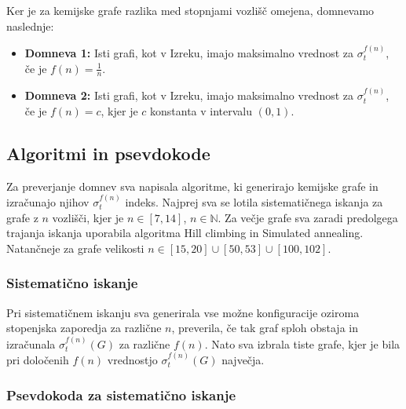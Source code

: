 \documentclass{article}
\begin{document}
Ker je za kemijske grafe razlika med stopnjami vozlišč omejena, domnevamo naslednje: 

\begin{itemize}
    \item \textbf{Domneva 1:} Isti grafi, kot v Izreku, imajo maksimalno vrednost za $\sigma_t^{f(n)}$, če je $f(n) = \frac{1}{n}$. 
    \item \textbf{Domneva 2:} Isti grafi, kot v Izreku, imajo maksimalno vrednost za $\sigma_t^{f(n)}$, če je $f(n) = c$, kjer je $c$ konstanta v intervalu $(0, 1)$. 

\end{itemize}

\subsection*{Algoritmi in psevdokode}
Za preverjanje domnev sva napisala algoritme, ki generirajo kemijske grafe in izračunajo njihov $\sigma_t^{f(n)}$ indeks.
Najprej sva se lotila sistematičnega iskanja za grafe z $n$ vozlišči, kjer je $n \in [7, 14]$, $n \in \mathbb{N}$.
Za večje grafe sva zaradi predolgega trajanja iskanja uporabila algoritma Hill climbing in Simulated annealing. Natančneje
za grafe velikosti $n \in [15, 20] \cup [50, 53] \cup [100, 102]$.

\subsubsection*{Sistematično iskanje}
Pri sistematičnem iskanju sva generirala vse možne konfiguracije oziroma
stopenjska zaporedja za različne $n$, preverila, če tak graf sploh obstaja
in izračunala $\sigma_t^{f(n)}(G)$ za različne $f(n)$. Nato sva
izbrala tiste grafe, kjer je bila pri določenih $f(n)$ vrednostjo $\sigma_t^{f(n)}(G)$
največja.


\subsubsection*{Psevdokoda za sistematično iskanje}
\end{document}
